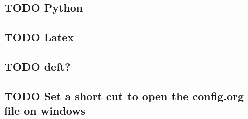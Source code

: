 \documentclass[11pt]{article}
\begin{document}
\subsection{{\bfseries\sffamily TODO} Python}
\label{sec:org2bbcde8}
\subsection{{\bfseries\sffamily TODO} Latex}
\label{sec:org5eece41}
\subsection{{\bfseries\sffamily TODO} deft?}
\label{sec:orgba9a0f9}
\subsection{{\bfseries\sffamily TODO} Set a short cut to open the config.org file on windows}
\label{sec:org872fb66}
\end{document}

